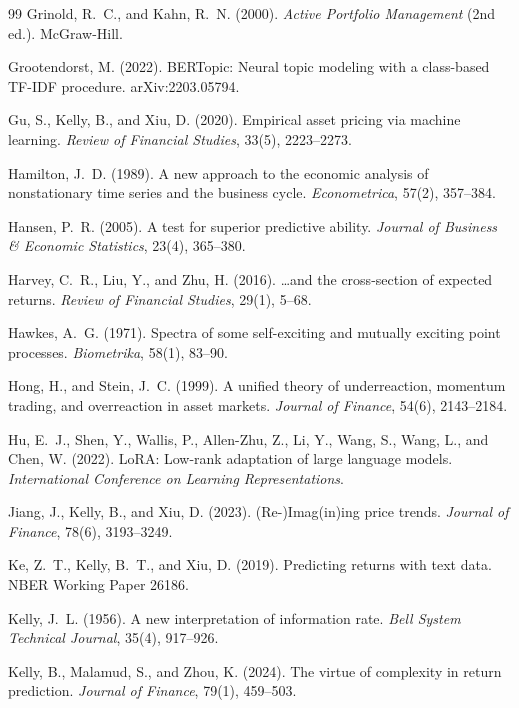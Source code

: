 \documentclass[11pt,a4paper]{article}
\theoremstyle{plain}
\theoremstyle{definition}
\theoremstyle{remark}
\begin{document}
\begin{thebibliography}{99}
Grinold, R.~C., and Kahn, R.~N. (2000). \emph{Active Portfolio Management} (2nd ed.). McGraw-Hill.

Grootendorst, M. (2022). BERTopic: Neural topic modeling with a class-based TF-IDF procedure. arXiv:2203.05794.

Gu, S., Kelly, B., and Xiu, D. (2020). Empirical asset pricing via machine learning. \emph{Review of Financial Studies}, 33(5), 2223--2273.

Hamilton, J.~D. (1989). A new approach to the economic analysis of nonstationary time series and the business cycle. \emph{Econometrica}, 57(2), 357--384.

Hansen, P.~R. (2005). A test for superior predictive ability. \emph{Journal of Business \& Economic Statistics}, 23(4), 365--380.

Harvey, C.~R., Liu, Y., and Zhu, H. (2016). \ldots and the cross-section of expected returns. \emph{Review of Financial Studies}, 29(1), 5--68.

Hawkes, A.~G. (1971). Spectra of some self-exciting and mutually exciting point processes. \emph{Biometrika}, 58(1), 83--90.

Hong, H., and Stein, J.~C. (1999). A unified theory of underreaction, momentum trading, and overreaction in asset markets. \emph{Journal of Finance}, 54(6), 2143--2184.

Hu, E.~J., Shen, Y., Wallis, P., Allen-Zhu, Z., Li, Y., Wang, S., Wang, L., and Chen, W. (2022). LoRA: Low-rank adaptation of large language models. \emph{International Conference on Learning Representations}.

Jiang, J., Kelly, B., and Xiu, D. (2023). (Re-)Imag(in)ing price trends. \emph{Journal of Finance}, 78(6), 3193--3249.

Ke, Z.~T., Kelly, B.~T., and Xiu, D. (2019). Predicting returns with text data. NBER Working Paper 26186.

Kelly, J.~L. (1956). A new interpretation of information rate. \emph{Bell System Technical Journal}, 35(4), 917--926.

Kelly, B., Malamud, S., and Zhou, K. (2024). The virtue of complexity in return prediction. \emph{Journal of Finance}, 79(1), 459--503.


\end{thebibliography}
\end{document}
